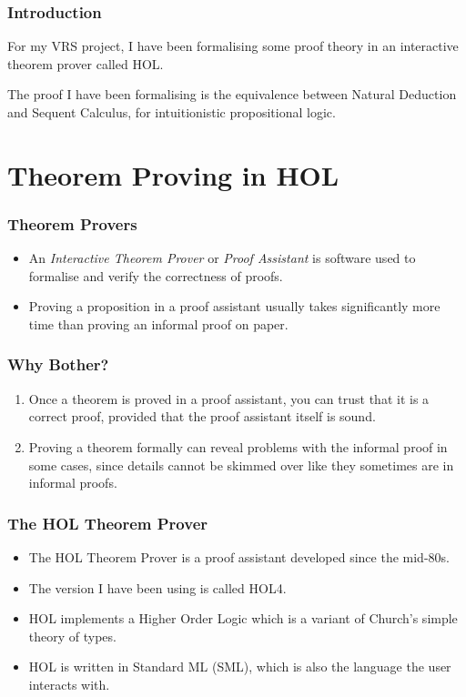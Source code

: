 \documentclass[english,svgnames,hide notes,12pt]{beamer}
\title{\large\presentationtitle}
\author{Alexander Cox\\
		\small Supervised by Michael Norrish\\
		\small The Australian National University
	}
\date{\today}
\theoremstyle{definition}
\theoremstyle{remark}
\begin{document}
\thispagestyle{empty}
\begin{frame}
    \titlepage{}
\end{frame}

\begin{frame}
    \frametitle{Introduction}
    For my VRS project, I have been formalising some proof theory in an interactive theorem prover called HOL. 

    The proof I have been formalising is the equivalence between Natural Deduction and Sequent Calculus, for intuitionistic propositional logic.
\end{frame}

\section{Theorem Proving in HOL}

\begin{frame}
    \frametitle{Theorem Provers}
    \begin{itemize}
        \item An \emph{Interactive Theorem Prover} or \emph{Proof Assistant} is software used to formalise and verify the correctness of proofs.
        \item Proving a proposition in a proof assistant usually takes significantly more time than proving an informal proof on paper.
    \end{itemize}
\end{frame}

\begin{frame}
    \frametitle{Why Bother?}
    \begin{enumerate}
        \item Once a theorem is proved in a proof assistant, you can trust that it is a correct proof, provided that the proof assistant itself is sound.
        \item Proving a theorem formally can reveal problems with the informal proof in some cases, since details cannot be skimmed over like they sometimes are in informal proofs.
    \end{enumerate}
\end{frame}

\begin{frame}
	\frametitle{The HOL Theorem Prover}
    \begin{itemize}
        \item The HOL Theorem Prover is a proof assistant developed since the mid-80s. 
        \item The version I have been using is called HOL4. 
        \item HOL implements a Higher Order Logic which is a variant of Church's simple theory of types.
        \item HOL is written in Standard ML (SML), which is also the language the user interacts with.
    \end{itemize}
\end{frame}
\end{document}
